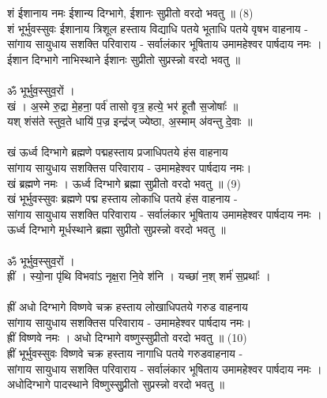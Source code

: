 शं ईशानाय नमः  ईशान्य दिग्भागे, ईशानः सुप्रीतो  वरदो भवतु ॥ (8)\\
{\small शं भूर्भुवस्सुवः ईशानाय त्रिशूल हस्ताय विद्याधि पतये भूताधि पतये वृषभ वाहनाय -\\
सांगाय सायुधाय सशक्ति परिवाराय - सर्वालंकार भूषिताय उमामहेश्वर पार्षदाय नमः ।\\
ईशान दिग्भागे नाभिस्थाने ईशानः सुप्रीतो सुप्रस्न्नो वरदो भवतु ॥}\\
\\
ॐ भूर्भुव॒स्सुव॒रों ।\\
खं । अ॒स्मे रु॒द्रा मे॒हना॒ पर्व॑ तासो वृत्र॒ हत्ये॒ भर॑ हूतौ स॒जोषाः᳚ ॥\\
यश् शंस॑ते स्तुव॒ते धायि॑ प॒ज्र इन्द्र॑ज् ज्येष्ठा, अ॒स्माम् अ॑वन्तु दे॒वाः ॥\\
\\
खं ऊर्ध्व दिग्भागे ब्रह्मणे पद्महस्ताय प्रजाधिपतये हंस वाहनाय\\
सांगाय सायुधाय सशक्तिस परिवाराय -  उमामहेश्वर पार्षदाय नमः।\\
खं ब्रह्मणे नमः । ऊर्ध्व दिग्भागे ब्रह्मा सुप्रीतो  वरदो भवतु ॥  (9)\\
{\small खं भूर्भुवस्सुवः ब्रह्मणे पद्म हस्ताय लोकाधि पतये हंस वाहनाय -\\
सांगाय सायुधाय सशक्ति परिवाराय - सर्वालंकार भूषिताय उमामहेश्वर पार्षदाय नमः ।\\
ऊर्ध्व दिग्भागे मूर्धस्थाने ब्रह्मा सुप्रीतो सुप्रस्न्नो वरदो भवतु ॥}\\
\\
ॐ भूर्भुव॒स्सुव॒रों ।\\
ह्रीं । स्यो॒ना पृ॑थि विभवा॑ऽ नृक्ष॒रा नि॒वे श॑नि । यच्छा॑ न॒श् शर्म॑ स॒प्रथाः᳚ ।\\
\\
ह्रीं अधो दिग्भागे विष्णवे चक्र हस्ताय लोखाधिपतये गरुड वाहनाय\\
सांगाय सायुधाय सशक्तिस परिवाराय -  उमामहेश्वर पार्षदाय नमः।\\
ह्रीं विष्णवे नमः । अधो दिग्भागे वष्णुस्सुप्रीतो वरदो भवतु ॥  (10)\\
{\small ह्रीं भूर्भुवस्सुवः विष्णवे चक्र हस्ताय नागाधि पतये गरुडवाहनाय -\\
सांगाय सायुधाय सशक्ति परिवाराय - सर्वालंकार भूषिताय उमामहेश्वर पार्षदाय नमः ।\\
अधोदिग्भागे पादस्थाने विष्णुस्सुुप्रीतो सुप्रस्न्नो वरदो भवतु ॥}\\

